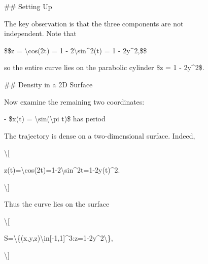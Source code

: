 \begin{figure}[t]
\begin{answercol}[equal height group=ansX1]
  \raggedright \#\# Setting Up\par\vspace{2pt}
  The key observation is that the three components are not independent. Note that\par\vspace{2pt}
  \$\$z = \textbackslash{}cos(2t) = 1 - 2\textbackslash{}sin\textasciicircum{}2(t) = 1 - 2y\textasciicircum{}2,\$\$\par\vspace{2pt}
  so the entire curve lies on the parabolic cylinder \$z = 1 - 2y\textasciicircum{}2\$.\par\vspace{2pt}
  \#\# Density in a 2D Surface\par\vspace{2pt}
  Now examine the remaining two coordinates:\par\vspace{2pt}
  - \$x(t) = \textbackslash{}sin(\textbackslash{}pi t)\$ has period\par\vspace{3pt}\elide
\end{answercol}\hspace{\columnsep}%
\begin{answercol}[equal height group=ansX1]
  \caret{}\par\vspace{4pt}
  \raggedright The trajectory is dense on a two-dimensional surface. Indeed,\par\vspace{2pt}
  \textbackslash{}[\par\vspace{2pt}
  z(t)=\textbackslash{}cos(2t)=1-2\textbackslash{}sin\textasciicircum{}2t=1-2y(t)\textasciicircum{}2.\par\vspace{2pt}
  \textbackslash{}]\par\vspace{2pt}
  Thus the curve lies on the surface\par\vspace{2pt}
  \textbackslash{}[\par\vspace{2pt}
  S=\textbackslash{}\{(x,y,z)\textbackslash{}in[-1,1]\textasciicircum{}3:z=1-2y\textasciicircum{}2\textbackslash{}\},\par\vspace{2pt}
  \textbackslash{}]\par\vspace{2pt}

\end{answercol}
\end{figure}
